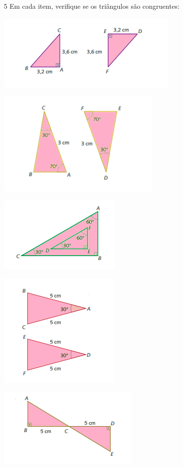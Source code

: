 {\num{5} Em cada item, verifique se os triângulos são congruentes:
\item
\includegraphics[width=3.51042in,height=1.48958in]{./imgSAEB_8_MAT/media/image19.png}
\item
\includegraphics[width=3.16667in,height=2.03958in]{./imgSAEB_8_MAT/media/image20.png}
\item
\includegraphics[width=2.38542in,height=1.47917in]{./imgSAEB_8_MAT/media/image21.png}
\item
\includegraphics[width=2.35417in,height=2.23958in]{./imgSAEB_8_MAT/media/image22.png}
\item
\includegraphics[width=2.73958in,height=1.54167in]{./imgSAEB_8_MAT/media/image23.png}

}
